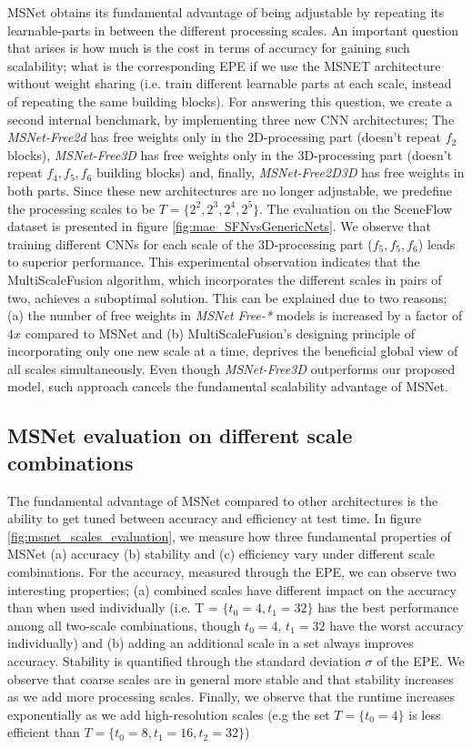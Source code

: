 \documentclass[runningheads]{llncs}
\begin{document}
MSNet obtains its fundamental advantage of being adjustable by repeating its learnable-parts in between the different processing scales. An important question that arises is how much is the cost in terms of accuracy for gaining such scalability; what is the corresponding EPE if we use the MSNET architecture without weight sharing (i.e. train different learnable parts at each scale, instead of repeating the same building blocks). For answering this question, we create a second internal benchmark, by implementing three new CNN architectures; The \textit{MSNet-Free2d} has free weights only in the 2D-processing part (doesn't repeat $f_2$ blocks), \textit{MSNet-Free3D} has free weights only in the 3D-processing part (doesn't repeat $f_4, f_5, f_6$ building blocks) and, finally, \textit{MSNet-Free2D3D} has free weights in both parts. Since these new architectures are no longer adjustable, we predefine the processing scales to be $T = \{2^2, 2^3, 2^4, 2^5\}$. The evaluation on the SceneFlow dataset is presented in figure \ref{fig:mae_SFNvsGenericNets}. We observe that training different CNNs for each scale of the 3D-processing part ($f_5, f_5, f_6$) leads to superior performance. This experimental observation indicates that the MultiScaleFusion algorithm, which incorporates the different scales in pairs of two, achieves a suboptimal solution. This can be explained due to two reasons; (a) the number of free weights in \textit{MSNet Free-*} models is increased by a factor of $4x$ compared to MSNet and (b) MultiScaleFusion's designing principle of incorporating only one new scale at a time, deprives the beneficial global view of all scales simultaneously. Even though \textit{MSNet-Free3D} outperforms our proposed model, such approach cancels the fundamental scalability advantage of MSNet.

\subsection{MSNet evaluation on different scale combinations}

The fundamental advantage of MSNet compared to other architectures is the ability to get tuned between accuracy and efficiency at test time. In figure \ref{fig:msnet_scales_evaluation}, we measure how three fundamental properties of MSNet (a) accuracy (b) stability and (c) efficiency vary under different scale combinations. For the accuracy, measured through the EPE, we can observe two interesting properties; (a) combined scales have different impact on the accuracy than when used individually (i.e. T = $\{t_0=4,t_1=32\}$ has the best performance among all two-scale combinations, though $t_0=4$, $t_1=32$ have the worst accuracy individually) and (b) adding an additional scale in a set always improves accuracy. Stability is quantified through the standard deviation $\sigma$ of the EPE. We observe that coarse scales are in general more stable and that stability increases as we add more processing scales. Finally, we observe that the runtime increases exponentially as we add high-resolution scales (e.g the set $T = \{t_0=4\}$ is less efficient than $T = \{t_0=8, t_1 = 16, t_2 =32\}$)
\end{document}
